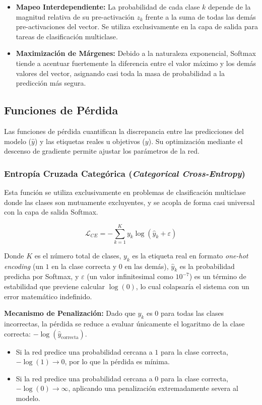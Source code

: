 \begin{itemize}
    \item \textbf{Mapeo Interdependiente:} La probabilidad de cada clase $k$ depende de la magnitud relativa de su pre-activación $z_k$ frente a la suma de todas las demás pre-activaciones del vector. Se utiliza exclusivamente en la capa de salida para tareas de clasificación multiclase.
    \item \textbf{Maximización de Márgenes:} Debido a la naturaleza exponencial, Softmax tiende a acentuar fuertemente la diferencia entre el valor máximo y los demás valores del vector, asignando casi toda la masa de probabilidad a la predicción más segura.
\end{itemize}

\subsection{Funciones de Pérdida}

Las funciones de pérdida cuantifican la discrepancia entre las predicciones del modelo ($\hat{y}$) y las etiquetas reales u objetivos ($y$). Su optimización mediante el descenso de gradiente permite ajustar los parámetros de la red.

\subsubsection{Entropía Cruzada Categórica (\textit{Categorical Cross-Entropy})}

Esta función se utiliza exclusivamente en problemas de clasificación multiclase donde las clases son mutuamente excluyentes, y se acopla de forma casi universal con la capa de salida Softmax.

\begin{equation}
    \mathcal{L}_{CE} = -\sum_{k=1}^K y_k \log\left(\hat{y}_k + \varepsilon\right)
\end{equation}

Donde $K$ es el número total de clases, $y_k$ es la etiqueta real en formato \textit{one-hot encoding} (un $1$ en la clase correcta y $0$ en las demás), $\hat{y}_k$ es la probabilidad predicha por Softmax, y $\varepsilon$ (un valor infinitesimal como $10^{-7}$) es un término de estabilidad que previene calcular $\log(0)$, lo cual colapsaría el sistema con un error matemático indefinido.
 
 \textbf{Mecanismo de Penalización:} 
Dado que $y_k$ es $0$ para todas las clases incorrectas, la pérdida se reduce a evaluar únicamente el logaritmo de la clase correcta: $-\log(\hat{y}_{\text{correcta}})$. 
\begin{itemize}
    \item Si la red predice una probabilidad cercana a $1$ para la clase correcta, $-\log(1) \to 0$, por lo que la pérdida es mínima.
    \item Si la red predice una probabilidad cercana a $0$ para la clase correcta, $-\log(0) \to \infty$, aplicando una penalización extremadamente severa al modelo.
\end{itemize}

